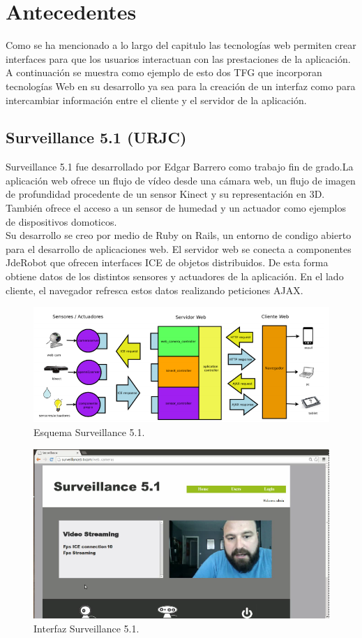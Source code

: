 \section{Antecedentes}
Como se ha mencionado a lo largo del capitulo las tecnologías web permiten crear interfaces para que los usuarios interactuan con las prestaciones de la aplicación. A continuación se muestra como ejemplo de esto dos TFG que incorporan tecnologías Web en su desarrollo ya sea para la creación de un interfaz como para intercambiar información entre el cliente y el servidor de la aplicación.
\subsection*{Surveillance 5.1 (URJC)}
Surveillance 5.1 \cite{TFGsurveillance5.1}\cite{surveillance5.1} fue desarrollado por Edgar Barrero como trabajo fin de grado.La aplicación web ofrece un flujo de vídeo desde una cámara web, un flujo de imagen de profundidad procedente de un sensor Kinect y su representación en 3D. También ofrece el acceso a un sensor de humedad y un actuador como ejemplos de dispositivos domoticos.
\\Su desarrollo se creo por medio de Ruby on Rails, un entorno de condigo abierto para el desarrollo de aplicaciones web. El servidor web se conecta a componentes JdeRobot que ofrecen interfaces ICE de objetos distribuidos. De esta forma obtiene datos de los distintos sensores y actuadores de la aplicación. En el lado cliente, el navegador refresca
estos datos realizando peticiones AJAX.
\begin{figure}[!h]
\centering
\includegraphics[width=0.5\linewidth]{Figures/edgar_surveillance_esquema}
\decoRule
\caption[Esquema Surveillance 5.1]{Esquema Surveillance 5.1.}
\label{fig:edgar_surveillance_esquema}
\end{figure}
\begin{figure}[!h]
\centering
\includegraphics[width=0.5\linewidth]{Figures/edgar_surveillance5_web}
\decoRule
\caption[Interfaz Surveillance 5.1.]{Interfaz Surveillance 5.1.}
\label{fig:edgar_surveillance5_web}
\end{figure}
